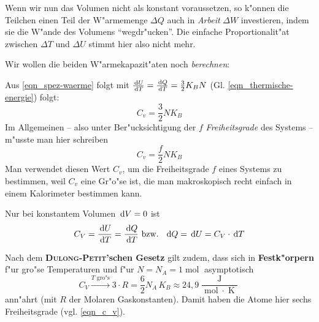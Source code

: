 Wenn wir nun das Volumen nicht als konstant voraussetzen, so k"onnen
die Teilchen einen Teil der W"armemenge $\Delta Q$ auch in
\emph{Arbeit} $\Delta W$ investieren, indem sie die W"ande des Volumens
"`wegdr"ucken"'. Die einfache Proportionalit"at zwischen $\Delta T$ und
$\Delta U$ stimmt hier also nicht mehr.

Wir wollen die beiden W"armekapazit"aten noch \emph{berechnen}:

\begin{description}[\setlabelstyle{\bfseries\slshape}]
\item[Konstantes Volumen] 
Aus \eqref{eqn_spez-waerme} folgt mit $\frac{\, \mathrm{d} U}{\, \mathrm{d} T } =
\frac{\, \mathrm{d} Q}{\, \mathrm{d} T} = \frac{3}{2} K_B N$
(Gl. \eqref{eqn_thermische-energie}) folgt:
\begin{equation*}
   C_v = \frac{3}{2} N K_B 
\end{equation*}
Im Allgemeinen -- also unter Ber"ucksichtigung der $f$
\emph{Freiheitsgrade} des Systems -- m"usste man hier schreiben
\begin{equation}
   \label{eqn_c_v}
\boxed{ C_v = \frac{f}{2} N K_B  }
\end{equation}
Man verwendet diesen Wert $C_v$, um die Freiheitsgrade $f$ eines Systems
zu bestimmen, weil $C_v$ eine Gr"o"se ist, die man makroskopisch recht
einfach in einem Kalorimeter bestimmen kann.
\begin{Wichtig}
   Nur bei konstantem Volumen $\, \mathrm{d} V = 0$ ist 
   \begin{equation*}
      C_V = \frac{\, \mathrm{d} U}{\, \mathrm{d} T} = \frac{\, \mathrm{d} Q}{\, \mathrm{d} T} \text{
        bzw. } ~ \, \mathrm{d} Q = \, \mathrm{d} U = C_V \cdot \, \mathrm{d} T
   \end{equation*}
\end{Wichtig}

Nach dem \textbf{\textsc{Dulong-Petit}'schen Gesetz} gilt zudem, dass sich
in \textbf{Festk"orpern} f"ur gro"se Temperaturen und f"ur $N = N_A =
1\operatorname{mol}$ asymptotisch
$$ { C_V \stackrel{T\text{ gro"s}}{\to} 3\cdot R = \frac{6}{2}N_A \,
  K_B} \approx 24,9
\frac{\operatorname{J}}{\operatorname{mol}\cdot \operatorname{K}}$$
 ann"ahrt (mit $R$ der Molaren Gaskonstanten).  Damit haben die Atome
 hier sechs Freiheitsgrade (vgl. \eqref{eqn_c_v}).


\end{description}
